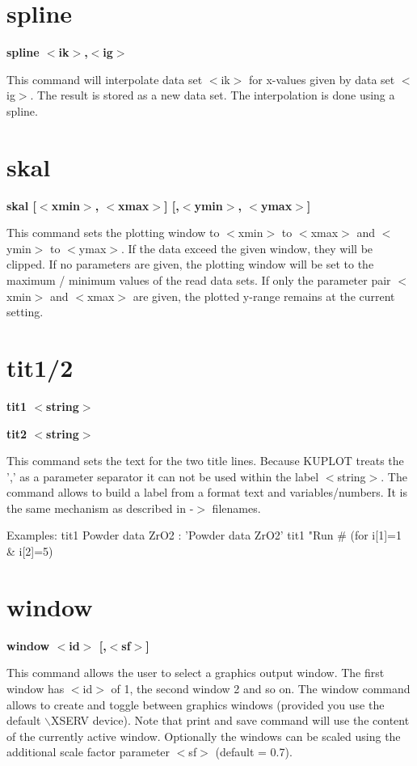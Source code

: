 \section{spline}
{\bf spline $ <$ik$> $,$ <$ig$> $ \par }
\par
\vspace{3pt}
This command will interpolate data set $ <$ik$> $ for x-values given 
by data set $ <$ig$> $. The result is stored as a new data set. The 
interpolation is done using a spline. 
\section{skal}
{\bf skal [$ <$xmin$> $, $ <$xmax$> $] [,$ <$ymin$> $, $ <$ymax$> $] \par }
\par
\vspace{3pt}
This command sets the plotting window to $ <$xmin$> $ to $ <$xmax$> $ and $ <$ymin$> $ 
to $ <$ymax$> $. If the data exceed the given window, they will be clipped. 
If no parameters are given, the plotting window will be set to the 
maximum / minimum values of the read data sets. If only the parameter 
pair $ <$xmin$> $ and $ <$xmax$> $ are given, the plotted y-range remains 
at the current setting. 
\section{tit1/2}
{\bf tit1 $ <$string$> $ \par }
{\bf tit2 $ <$string$> $ \par }
\par
\vspace{3pt}
This command sets the text for the two title lines. Because KUPLOT 
treats the ',' as a parameter separator it can not be used within 
the label $ <$string$> $. The command allows to build a label from a 
format text and variables/numbers. It is the same mechanism as 
described in -$> $ filenames. 
\par
\begin{MacVerbatim}
Examples:
tit1 Powder data ZrO2                   : 'Powder data ZrO2'
tit1 "Run #%
                                          (for i[1]=1 & i[2]=5)
\end{MacVerbatim}
\section{window}
{\bf window $ <$id$> $ [,$ <$sf$> $] \par }
\par
\vspace{3pt}
This command allows the user to select a graphics output window. 
The first window has $ <$id$> $ of 1, the second window 2 and so on. 
The window command allows to create and toggle between graphics 
windows (provided you use the default $\backslash$XSERV device). Note that 
print and save command will use the content of the currently 
active window. Optionally the windows can be scaled using the 
additional scale factor parameter $ <$sf$> $ (default = 0.7). 
